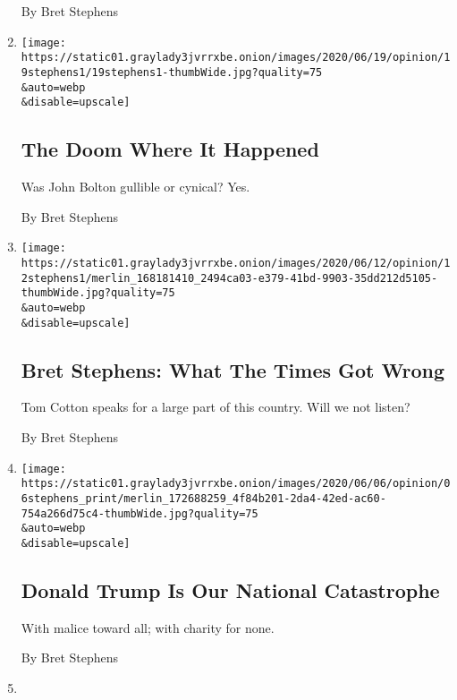 \begin{enumerate}
  By Bret Stephens
\item
  \href{/2020/06/19/opinion/bolton-book.html}{}

  \texttt{[image: https://static01.graylady3jvrrxbe.onion/images/2020/06/19/opinion/19stephens1/19stephens1-thumbWide.jpg?quality=75\\\&auto=webp\\\&disable=upscale]}

  \hypertarget{the-doom-where-it-happened}{%
  \subsection{The Doom Where It
  Happened}\label{the-doom-where-it-happened}}

  Was John Bolton gullible or cynical? Yes.

  By Bret Stephens
\item
  \href{/2020/06/12/opinion/tom-cotton-op-ed.html}{}

  \texttt{[image: https://static01.graylady3jvrrxbe.onion/images/2020/06/12/opinion/12stephens1/merlin\_168181410\_2494ca03-e379-41bd-9903-35dd212d5105-thumbWide.jpg?quality=75\\\&auto=webp\\\&disable=upscale]}

  \hypertarget{bret-stephens-what-the-times-got-wrong}{%
  \subsection{Bret Stephens: What The Times Got
  Wrong}\label{bret-stephens-what-the-times-got-wrong}}

  Tom Cotton speaks for a large part of this country. Will we not
  listen?

  By Bret Stephens
\item
  \href{/2020/06/05/opinion/donald-trump.html}{}

  \texttt{[image: https://static01.graylady3jvrrxbe.onion/images/2020/06/06/opinion/06stephens\_print/merlin\_172688259\_4f84b201-2da4-42ed-ac60-754a266d75c4-thumbWide.jpg?quality=75\\\&auto=webp\\\&disable=upscale]}

  \hypertarget{donald-trump-is-our-national-catastrophe}{%
  \subsection{Donald Trump Is Our National
  Catastrophe}\label{donald-trump-is-our-national-catastrophe}}

  With malice toward all; with charity for none.

  By Bret Stephens
\item
  \href{/2020/05/29/opinion/china-hong-kong.html}{}


\end{enumerate}
